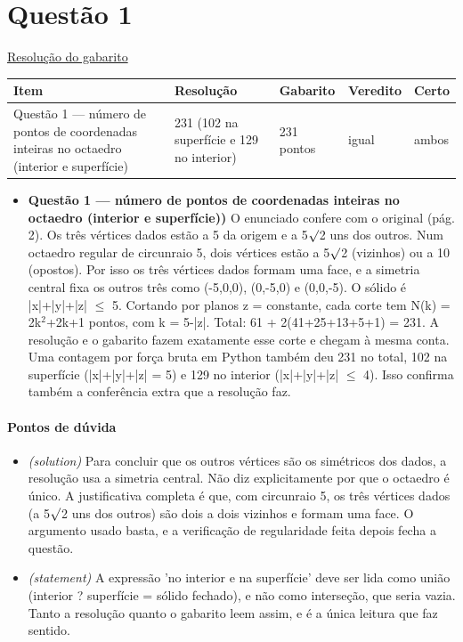 \documentclass{article}%
\begin{document}
\section*{Questão 1}%
\href{https://poliedroresolve.sistemapoliedro.com.br/vestibulares/ita/2026/ita-2-fase-dia-1-28-10-2025-2-fase-dia-1/dissertativa-1-matematica-2-fase-dia-1-ita-2026}{Resolução do gabarito}\par\smallskip%
\begin{longtable}{@{}p{} p{} p{} p{} p{}@{}}\toprule Item & Resolução & Gabarito & Veredito & Certo \\ \midrule
Questão 1 --- número de pontos de coordenadas inteiras no octaedro (interior e superfície) & 231 (102 na superfície e 129 no interior) & 231 pontos & igual & ambos \\
\bottomrule\end{longtable}%
\begin{itemize}%
\item%
\textbf{Questão 1 --- número de pontos de coordenadas inteiras no octaedro (interior e superfície))} O enunciado confere com o original (pág. 2). Os três vértices dados estão a 5 da origem e a 5$\surd$2 uns dos outros. Num octaedro regular de circunraio 5, dois vértices estão a 5$\surd$2 (vizinhos) ou a 10 (opostos). Por isso os três vértices dados formam uma face, e a simetria central fixa os outros três como (-5,0,0), (0,-5,0) e (0,0,-5). O sólido é |x|+|y|+|z| $\leq$ 5. Cortando por planos z = constante, cada corte tem N(k) = 2k$^2$+2k+1 pontos, com k = 5-|z|. Total: 61 + 2(41+25+13+5+1) = 231. A resolução e o gabarito fazem exatamente esse corte e chegam à mesma conta. Uma contagem por força bruta em Python também deu 231 no total, 102 na superfície (|x|+|y|+|z| = 5) e 129 no interior (|x|+|y|+|z| $\leq$ 4). Isso confirma também a conferência extra que a resolução faz.%
\end{itemize}%
\paragraph{Pontos de dúvida}%
\begin{itemize}%
\item%
\textit{(solution)} Para concluir que os outros vértices são os simétricos dos dados, a resolução usa a simetria central. Não diz explicitamente por que o octaedro é único. A justificativa completa é que, com circunraio 5, os três vértices dados (a 5$\surd$2 uns dos outros) são dois a dois vizinhos e formam uma face. O argumento usado basta, e a verificação de regularidade feita depois fecha a questão.%
\item%
\textit{(statement)} A expressão 'no interior e na superfície' deve ser lida como união (interior ? superfície = sólido fechado), e não como interseção, que seria vazia. Tanto a resolução quanto o gabarito leem assim, e é a única leitura que faz sentido.%
\end{itemize}%
\end{document}
